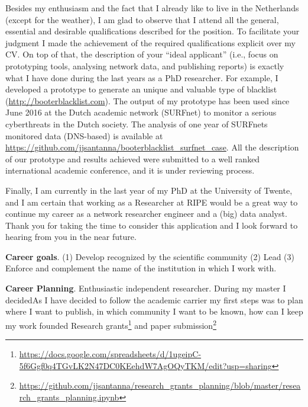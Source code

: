 \documentclass[11pt,a4paper,sans]{moderncv}%
\begin{document}
Besides my enthusiasm and the fact that I already like to live in the
Netherlands (except for the weather), I am glad to observe that I attend all the
general, essential and desirable qualifications described for the position. To
facilitate your judgment I made the achievement of the required qualifications
explicit over my CV. On top of that, the description of your ``ideal applicant''
(i.e., focus on prototyping tools, analysing network data, and publishing
reports) is exactly what I have done during the last years as a PhD researcher.
For example, I developed a prototype to generate an unique and valuable type of
blacklist (\url{http://booterblacklist.com}). The output of my prototype has
been used since June 2016 at the Dutch academic network (SURFnet) to monitor a
serious cyberthreats in the Dutch society. The analysis of one year of SURFnets
monitored data (DNS-based) is available at
\url{https://github.com/jjsantanna/booterblacklist_surfnet_case}. All the
description of our prototype and results achieved were submitted to a well
ranked international academic conference, and it is under reviewing process.

Finally, I am currently in the last year of my PhD at the University of Twente,
and I am certain that working as a Researcher at RIPE would be a great way to
continue my career as a network researcher engineer and a (big) data analyst.
Thank you for taking the time to consider this application and I look forward to
hearing from you in the near future.

\textbf{Career goals}. (1) Develop
recognized by the scientific community 
(2) Lead
(3) Enforce and complement the name of the institution in which I work with.


\textbf{Career Planning}. Enthusiastic independent researcher. During my master
I decidedAs I have decided to follow the academic carrier my first steps was to
plan where I want to publish, in which community I want to be known, how can I
keep my work founded 	Research
grants\footnote{\url{https://docs.google.com/spreadsheets/d/1ugeipC-5f6Ggf0q4TGvLK2N47DC0KEehdW7AgOQyTKM/edit?usp=sharing}}
and paper
submission\footnote{\url{https://github.com/jjsantanna/research_grants_planning/blob/master/research_grants_planning.ipynb}} 



\makeletterclosing
\end{document}
